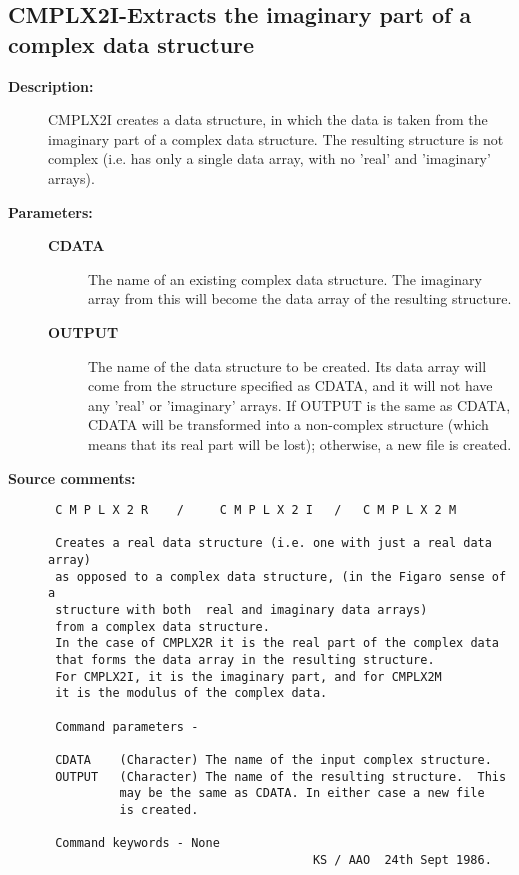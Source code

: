 \subsection{CMPLX2I-\label{CMPLX2I}Extracts the imaginary part of a complex data structure}
\begin{description}

\item [{\bf Description:}]
 CMPLX2I creates a data structure, in which the data is taken
 from the imaginary part of a complex data structure.  The
 resulting structure is not complex (i.e. has only a single data
 array, with no 'real' and 'imaginary' arrays).

\item [{\bf Parameters:}]
\begin{description}
\item [{\bf CDATA}]
 The name of an existing complex data structure.
 The imaginary array from this will become the data array
 of the resulting structure.
\item [{\bf OUTPUT}]
 The name of the data structure to be created.
 Its data array will come from the structure specified as
 CDATA, and it will not have any 'real' or 'imaginary'
 arrays.  If OUTPUT is the same as CDATA, CDATA will be
 transformed into a non-complex structure (which means
 that its real part will be lost); otherwise, a new file
 is created.
\end{description}

\item [{\bf Source comments:}]
\begin{verbatim}
 C M P L X 2 R    /     C M P L X 2 I   /   C M P L X 2 M

 Creates a real data structure (i.e. one with just a real data array)
 as opposed to a complex data structure, (in the Figaro sense of a
 structure with both  real and imaginary data arrays)
 from a complex data structure.
 In the case of CMPLX2R it is the real part of the complex data
 that forms the data array in the resulting structure.
 For CMPLX2I, it is the imaginary part, and for CMPLX2M
 it is the modulus of the complex data.

 Command parameters -

 CDATA    (Character) The name of the input complex structure.
 OUTPUT   (Character) The name of the resulting structure.  This
          may be the same as CDATA. In either case a new file
          is created.

 Command keywords - None
                                     KS / AAO  24th Sept 1986.
\end{verbatim}
\end{description}
